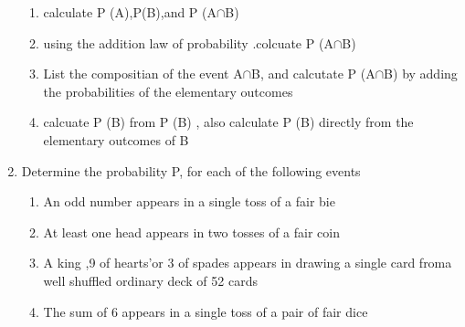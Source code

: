\documentclass[12pt]{article}
\begin{document}
\begin{enumerate}
\begin{enumerate}
\item calculate P (A),P(B),and P (A$\cap$B)
\item using the addition law of probability .colcuate P (A$\cap$B)
\item List the compositian of the event A$\cap$B, and calcutate P (A$\cap$B) by adding the probabilities of the elementary outcomes
\item calcuate P (B) from P (B) , also calculate P (B) directly from the elementary outcomes of B
\end{enumerate} 
\item Determine the probability P, for each of the following events 
\begin{enumerate} 
\item An odd number appears in a single toss of a fair bie
\item At least one head appears in two tosses of a fair coin 
\item A king ,9 of hearts'or 3 of spades appears in drawing a single card froma well shuffled ordinary deck of 52 cards
\item The sum of 6 appears in a single toss of a pair of fair dice
\end{enumerate} 

\end{enumerate}
\end{document}
